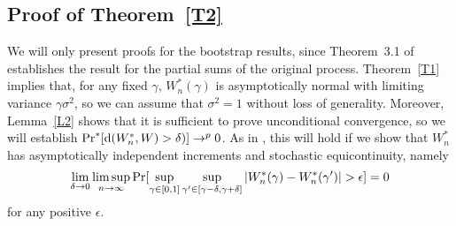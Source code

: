 \documentclass[11pt]{article}
\begin{document}
\subsection*{Proof of Theorem~\ref{T2}}
\newcommand{\gn}{{\lfloor \gamma n \rfloor}}
\newcommand{\gJ}{{\lfloor \gamma J_n \rfloor}}
\newcommand{\lastK}{{K_{n, \gJ}}}

We will only present proofs for the bootstrap results, since
Theorem~3.1 of \cite{JoD:00b} establishes the result for the partial
sums of the original process.  Theorem~\ref{T1}
implies that, for any fixed $\gamma$, $W_n^{*}(\gamma)$ is
asymptotically normal with limiting variance $\gamma \sigma^2$, so we
can assume that $\sigma^2 = 1$ without loss of generality. Moreover,
Lemma~\ref{L2} shows that it is
sufficient to prove unconditional convergence, so we will establish
$\operatorname{Pr}^*[\operatorname{d}(W_n^{*}, W) > \delta)] \to^p 0$. As in \cite{JoD:00b},
this will hold if we show that $W_n^{*}$ has asymptotically
independent increments and stochastic equicontinuity, namely
\begin{equation}\label{eq:9}
  \lim_{\delta \to 0} \limsup_{n \to \infty} \operatorname{Pr}[\sup_{\gamma \in [0,1]}
  \sup_{\gamma' \in [\gamma - \delta, \gamma + \delta]}
    | W_n^{*}(\gamma) - W_n^{*}(\gamma') | > \epsilon] = 0
\end{equation}
for any positive $\epsilon$.
\end{document}
